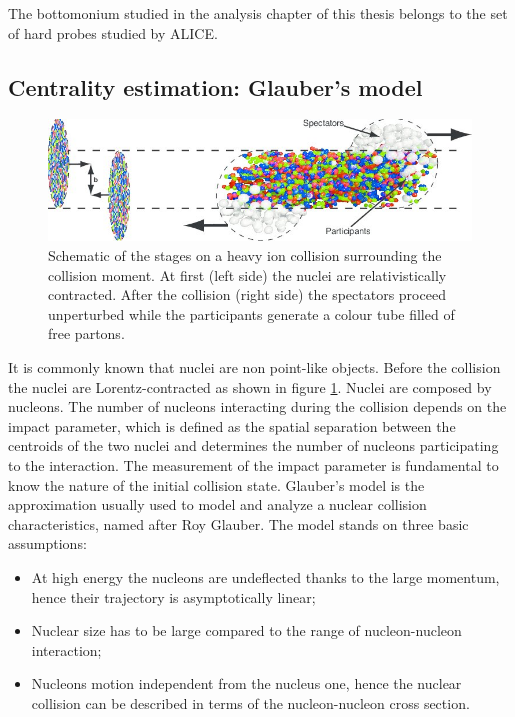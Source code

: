 The bottomonium studied in the analysis chapter of this thesis belongs to the set of hard probes studied by ALICE.

\subsection{Centrality estimation: Glauber's model}
\label{intro_glauber}

\begin{figure}[!ht]
\begin{center}
\includegraphics[width=0.99\linewidth]{Chapters/Introduction/Figs/collision.jpg}
\caption{Schematic of the stages on a heavy ion collision surrounding the collision moment. At first (left side) the nuclei are relativistically contracted. After the collision (right side) the spectators proceed unperturbed while the participants generate a colour tube filled of free partons.}
\label{fig:collision}
\end{center}
\end{figure}

It is commonly known that nuclei are non point-like objects.
Before the collision the nuclei are Lorentz-contracted as shown in figure \ref{fig:collision}.
Nuclei are composed by nucleons. The number of nucleons interacting during the collision depends on the impact parameter, which is defined as the spatial separation between the centroids of the two nuclei and determines the number of nucleons participating to the interaction.
The measurement of the impact parameter is fundamental to know the nature of the initial collision state.
Glauber's model is the approximation usually used to model and analyze a nuclear collision characteristics, named after Roy Glauber.
The model stands on three basic assumptions:
\begin{itemize}
\item At high energy the nucleons are undeflected thanks to the large momentum, hence their trajectory is asymptotically linear;
\item Nuclear size has to be large compared to the range of nucleon-nucleon interaction;
\item Nucleons motion independent from the nucleus one, hence the nuclear collision can be described in terms of the nucleon-nucleon cross section.
\end{itemize}

